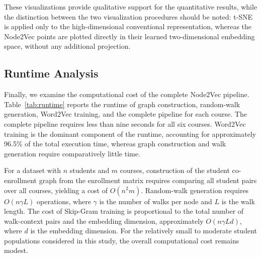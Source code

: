 \documentclass[pdflatex,sn-mathphys-num,iicol]{sn-jnl}%
\theoremstyle{thmstyleone}%
\theoremstyle{thmstyletwo}%
\theoremstyle{thmstylethree}%
\begin{document}
%






These visualizations provide qualitative support for the quantitative results, while the distinction between the two visualization procedures should be noted: t-SNE is applied only to the high-dimensional conventional representation, whereas the Node2Vec points are plotted directly in their learned two-dimensional embedding space, without any additional projection.



\subsection{Runtime Analysis}

Finally, we examine the computational cost of the complete Node2Vec pipeline. Table~\ref{tab:runtime} reports the runtime of graph construction, random-walk generation, Word2Vec training, and the complete pipeline for each course.
The complete pipeline requires less than nine seconds for all six courses. Word2Vec training is the dominant component of the runtime, accounting for approximately 96.5\% of the total execution time, whereas graph construction and walk generation require comparatively little time.

For a dataset with $n$ students and $m$ courses, construction of the student co-enrollment graph from the enrollment matrix requires comparing all student pairs over all courses, yielding a cost of $O(n^2 m)$. Random-walk generation requires $O(n \gamma L)$ operations, where $\gamma$ is the number of walks per node and $L$ is the walk length. The cost of Skip-Gram training is proportional to the total number of walk-context pairs and the embedding dimension, approximately $O(n \gamma L d)$, where $d$ is the embedding dimension. For the relatively small to moderate student populations considered in this study, the overall computational cost remains modest.
\end{document}
